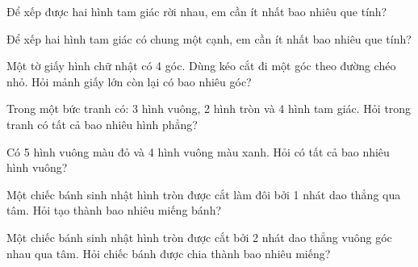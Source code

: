 \begin{ex}
Để xếp được hai hình tam giác rời nhau, em cần ít nhất bao nhiêu que tính?
\end{ex}

\begin{ex}
Để xếp hai hình tam giác có chung một cạnh, em cần ít nhất bao nhiêu que tính?
\end{ex}

\begin{ex}
Một tờ giấy hình chữ nhật có 4 góc. Dùng kéo cắt đi một góc theo đường chéo nhỏ. Hỏi mảnh giấy lớn còn lại có bao nhiêu góc?
\end{ex}

\begin{ex}
Trong một bức tranh có: 3 hình vuông, 2 hình tròn và 4 hình tam giác. Hỏi trong tranh có tất cả bao nhiêu hình phẳng?
\end{ex}

\begin{ex}
Có 5 hình vuông màu đỏ và 4 hình vuông màu xanh. Hỏi có tất cả bao nhiêu hình vuông?
\end{ex}

\begin{ex}
Một chiếc bánh sinh nhật hình tròn được cắt làm đôi bởi 1 nhát dao thẳng qua tâm. Hỏi tạo thành bao nhiêu miếng bánh?
\end{ex}

\begin{ex}
Một chiếc bánh sinh nhật hình tròn được cắt bởi 2 nhát dao thẳng vuông góc nhau qua tâm. Hỏi chiếc bánh được chia thành bao nhiêu miếng?
\end{ex}


